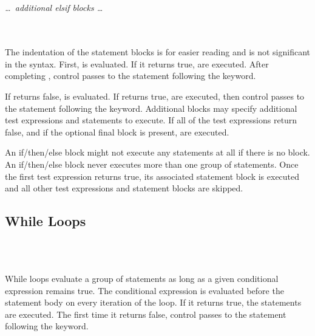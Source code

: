 \begin{syntax}
   \\
\codeindent{} \\
   \\
\codeindent{} \\
\textit{\dots\ additional elsif blocks \dots} \\
 \\
\codeindent{} \\
\end{syntax}

The indentation of the statement blocks is for easier reading and is
not significant in the syntax.  First,  is evaluated.  If it
returns true,  are executed.  After completing
, control passes to the statement following the
 keyword.  

If  returns false,  is evaluated.  If  returns
true,  are executed, then control passes to the
statement following the  keyword.  Additional 
blocks may specify additional test expressions and statements to
execute.  If all of the test expressions return false, and if the
optional final  block is present,  are
executed.

An if/then/else block might not execute any statements at all if there
is no  block.  An if/then/else block never executes more
than one group of statements. Once the first test expression returns
true, its associated statement block is executed and all other test
expressions and statement blocks are skipped.



\subsection{While Loops}

\begin{syntax}
 \expr{}  \\
\codeindent\statements{} \\
\end{syntax}

While loops evaluate a group of statements as long as a given
conditional expression remains true.  The conditional expression is
evaluated before the statement body on every iteration of the loop.
If it returns true, the statements are executed.  The first time it
returns false, control passes to the statement following the
 keyword.


